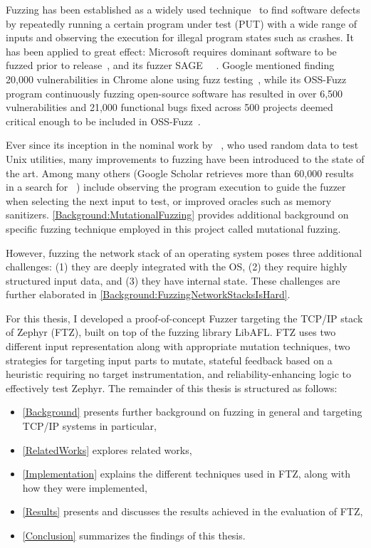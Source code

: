 \documentclass[twocolumn]{article}
\newcommand{\proj}{FTZ\xspace}
\let\savedCite=\cite
\renewcommand{\cite}{\unskip~\savedCite}
\begin{document}
Fuzzing has been established as a widely used technique\cite{Demystifying} to find software defects by repeatedly running a certain program under test (PUT) with a wide range of inputs and observing the execution for illegal program states such as crashes. It has been applied to great effect: Microsoft requires dominant software to be fuzzed prior to release\cite{Demystifying}, and its fuzzer SAGE\cite{SAGE} \cite{FuzzingTheStateOfTheArt}. Google mentioned finding 20,000 vulnerabilities in Chrome alone using fuzz testing\cite{Demystifying}, while its OSS-Fuzz program continuously fuzzing open-source software has resulted in over 6,500 vulnerabilities and 21,000 functional bugs fixed across 500 projects deemed critical enough to be included in OSS-Fuzz\cite{ClusterFuzzLite}.

Ever since its inception in the nominal work by \citeauthor{UNIX}\cite{UNIX}, who used random data to test Unix utilities, many improvements to fuzzing have been introduced to the state of the art. Among many others (Google Scholar retrieves more than 60,000 results in a search for \cite{GoogleScholarFuzzing}) include observing the program execution to guide the fuzzer when selecting the next input to test, or improved oracles such as memory sanitizers. \cref{Background:MutationalFuzzing} provides additional background on specific fuzzing technique employed in this project called mutational fuzzing.

However, fuzzing the network stack of an operating system poses three additional challenges: (1) they are deeply integrated with the OS, (2) they require highly structured input data, and (3) they have internal state. These challenges are further elaborated in \cref{Background:FuzzingNetworkStacksIsHard}.

For this thesis, I developed a proof-of-concept Fuzzer targeting the TCP/IP stack of Zephyr (\proj), built on top of the fuzzing library LibAFL. \proj uses two different input representation along with appropriate mutation techniques, two strategies for targeting input parts to mutate, stateful feedback based on a heuristic requiring no target instrumentation, and reliability-enhancing logic to effectively test Zephyr. The remainder of this thesis is structured as follows:

\begin{itemize}
  \item \cref{Background} presents further background on fuzzing in general and targeting TCP/IP systems in particular,
  \item \cref{RelatedWorks} explores related works,
  \item \cref{Implementation} explains the different techniques used in \proj, along with how they were implemented,
  \item \cref{Results} presents and discusses the results achieved in the evaluation of \proj,
  \item \cref{Conclusion} summarizes the findings of this thesis.
\end{itemize}
\end{document}
